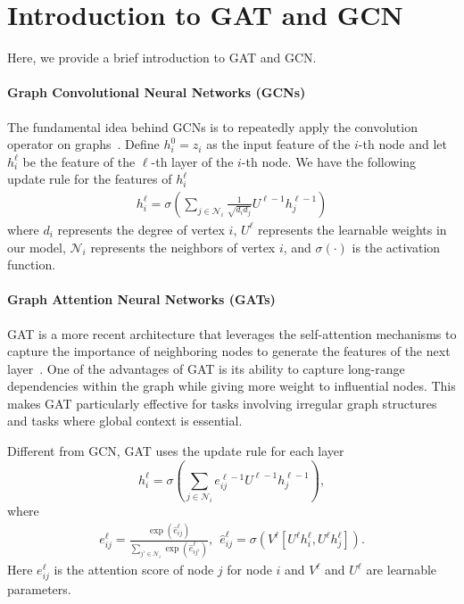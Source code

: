 \section{Introduction to GAT and GCN} \label{appendix:GAT_GCN}
Here, we provide a brief introduction to GAT and GCN.

\paragraph{Graph Convolutional Neural Networks (GCNs)} The fundamental idea behind GCNs is to repeatedly apply the convolution operator on graphs~\citep{kipf2016semi}.
Define $h_i^{0} = z_i$ as the input feature of the $i$-th node and let $h_i^{\ell}$ be the feature of the $\ell$-th layer of the $i$-th node.
We have the following update rule for the features of $h_i^{\ell}$
\begin{align*}
    h_i^{\ell} 
    =  \sigma \left( \sum_{j \in \mathcal{N}_i}  \frac{1}{\sqrt{d_i d_j }} U^{\ell-1} h_j^{\ell-1}\right)
\end{align*}
where $d_i$ represents the degree of vertex $i$, $U^{\ell}$ represents the learnable weights in our model, $\mathcal{N}_i$ represents the neighbors of vertex $i$, and $\sigma(\cdot)$ is the activation function. 

\paragraph{Graph Attention Neural Networks (GATs)}
GAT  is a more recent architecture that leverages the self-attention mechanisms to capture the importance of neighboring nodes to generate the features of the next layer~\citep{velivckovic2017graph}.
One of the advantages of GAT is its ability to capture long-range dependencies within the graph while giving more weight to influential nodes. This makes GAT particularly effective for tasks involving irregular graph structures and tasks where global context is essential.

Different from GCN, GAT uses the update rule for each layer
\[ h_i^{\ell} = \sigma \left(\sum_{j \in \mathcal{N}_i} e_{ij}^{\ell-1} U^{\ell-1}  h_j^{\ell-1}\right), \]
where 
\begin{align}
e_{ij}^{\ell} = \frac{\exp(\hat{e}_{ij}^{\ell})}{\sum_{j' \in \mathcal{N}_i} \exp(\hat{e}_{ij'}^{\ell})}, 
~~
\hat{e}_{ij}^{\ell} = \sigma\left(V^{\ell} [U^{\ell}h_i^{\ell}, U^{\ell}h_j^{\ell}]\right). \label{eqn:gat}
\end{align}
Here $e_{ij}^{\ell}$ is the attention score of node $j$ for node $i$ and $V^{\ell}$ and $U^{\ell}$ are learnable parameters.


